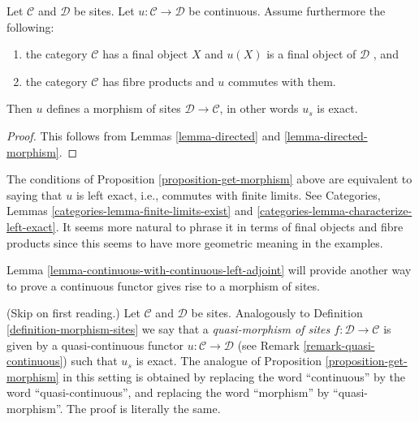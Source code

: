 \begin{proposition}
\label{proposition-get-morphism}
Let $\mathcal{C}$ and $\mathcal{D}$ be sites. Let
$u : \mathcal{C} \to \mathcal{D}$ be continuous.
Assume furthermore the following:
\begin{enumerate}
\item the category $\mathcal{C}$ has a final object $X$ and
$u(X)$ is a final object of $\mathcal{D}$ , and
\item the category $\mathcal{C}$ has fibre products and
$u$ commutes with them.
\end{enumerate}
Then $u$ defines a morphism of sites $\mathcal{D} \to
\mathcal{C}$, in other words $u_s$ is exact.
\end{proposition}

\begin{proof}
This follows from Lemmas \ref{lemma-directed} and
\ref{lemma-directed-morphism}.
\end{proof}

\begin{remark}
\label{remark-explain-left-exact}
The conditions of Proposition \ref{proposition-get-morphism} above
are equivalent to saying that $u$ is left exact, i.e., commutes
with finite limits. See
Categories, Lemmas
\ref{categories-lemma-finite-limits-exist} and
\ref{categories-lemma-characterize-left-exact}.
It seems more natural to phrase it in terms of final objects
and fibre products since this seems to have more geometric meaning
in the examples.
\end{remark}

\noindent
Lemma \ref{lemma-continuous-with-continuous-left-adjoint} will
provide another way to prove a continuous functor
gives rise to a morphism of sites.

\begin{remark}
\label{remark-quasi-continuous-morphism-sites}
(Skip on first reading.)
Let $\mathcal{C}$ and $\mathcal{D}$ be sites. Analogously to
Definition \ref{definition-morphism-sites} we say that
a {\it quasi-morphism of sites $f : \mathcal{D} \to \mathcal{C}$}
is given by a quasi-continuous functor $u : \mathcal{C} \to \mathcal{D}$
(see Remark \ref{remark-quasi-continuous}) such that $u_s$ is exact.
The analogue of Proposition \ref{proposition-get-morphism} in this
setting is obtained by replacing the word ``continuous''
by the word ``quasi-continuous'', and replacing the word
``morphism'' by ``quasi-morphism''. The proof is literally the
same.
\end{remark}

